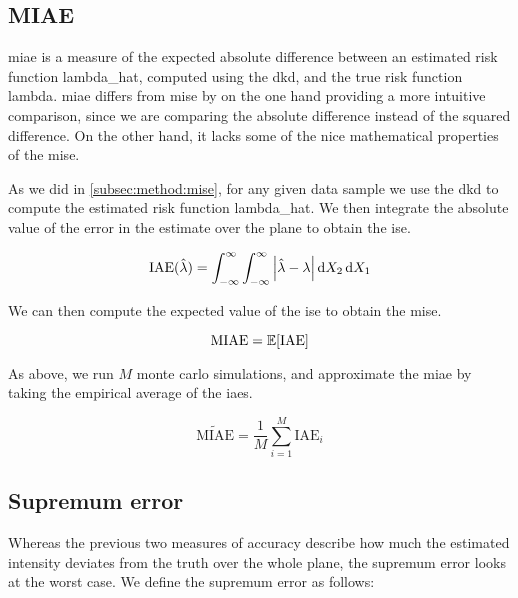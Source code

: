 \subsection{MIAE}
\label{subsec:method:miae}

\Gls{miae} is a measure of the expected absolute difference between an estimated risk function \gls{lambda_hat},
computed using the \gls{dkd}, and the true risk function \gls{lambda}.
\Gls{miae} differs from \gls{mise} by on the one hand providing a more intuitive comparison,
since we are comparing the absolute difference instead of the squared difference.
On the other hand, it lacks some of the nice mathematical properties of the \gls{mise}.

As we did in \autoref{subsec:method:mise}, for any given data sample we use the \gls{dkd} to compute the estimated risk function \gls{lambda_hat}.
We then integrate the absolute value of the error in the estimate over the plane to obtain the \gls{ise}.

\begin{equation}
    \mbox{IAE}(\hat{\lambda}) = \int_{-\infty}^{\infty} \int_{-\infty}^{\infty} \left| \hat{\lambda} - \lambda \right| \mathop{}\!\mathrm{d}{X_2} \mathop{}\!\mathrm{d}{X_1}
\end{equation}

We can then compute the expected value of the \gls{ise} to obtain the \gls{mise}.

\begin{equation}
    \mbox{MIAE} = \mathbb{E} [\mbox{IAE}]
\end{equation}

As above, we run \(M\) monte carlo simulations, and approximate the \gls{miae} by taking the empirical average of the \glspl{iae}.

\begin{equation}
    \widetilde{\mbox{MIAE}} = \frac{1}{M} \sum_{i=1}^{M} \mbox{IAE}_i
\end{equation}

\subsection{Supremum error}
\label{subsec:method:sup_error}

Whereas the previous two measures of accuracy describe how much the estimated intensity deviates from the truth over the whole plane,
the \gls{supremum error} looks at the worst case.
We define the \gls{supremum error} as follows:

